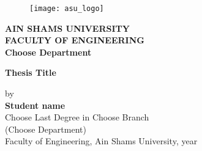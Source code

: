 \cleardoublepage
\newpage
\thispagestyle{empty}
\newlength{\thenamewidth}
\newlength{\thesignaturewidth}
\newlength{\nameskip}

\setlength{\thenamewidth}{8cm}
\setlength{\thesignaturewidth}{4cm}
\setlength{\nameskip}{0.8cm}


 \begin{center}
\begin{figure}
  \begin{center}
    \texttt{[image: asu\_logo]}
  \end{center}
\end{figure}
\small


\textbf{AIN SHAMS UNIVERSITY\\
	FACULTY OF ENGINEERING\\
	Choose Department}



\vfill
\Large
\textbf{Thesis Title} \\ 

\vfill
\small

by\\
\large
\textbf{Student name}\\
\small
Choose Last Degree in Choose Branch  \\
(Choose Department)\\
Faculty of Engineering, Ain Shams University, year\\







\end{center}
